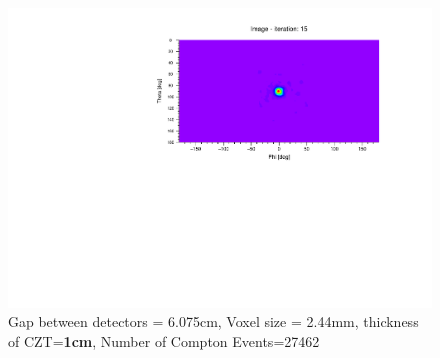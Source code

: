 \documentclass[10pt,a4paper]{article}
\begin{document}
\begin{figure}[H]
\centering
\includegraphics[trim={0 5cm 0 5cm}, scale=.75, angle=270, origin=c]{czt_t_czt_1}
\caption{Gap between detectors = 6.075cm, Voxel size = 2.44mm, thickness of CZT=\textbf{1cm}, Number of Compton Events=27462}
\end{figure}
\end{document}
